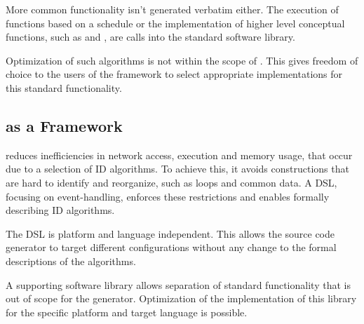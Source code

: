\documentclass[conference]{IEEEtran}
\begin{document}
More common functionality isn't generated verbatim either. The execution of
functions based on a schedule or the implementation of higher level conceptual
functions, such as  and , are calls into the standard
software library.

Optimization of such algorithms is not within the scope of \NAME. This gives
freedom of choice to the users of the framework to select appropriate
implementations for this standard functionality.

\subsection{\NAME as a Framework}

\NAME reduces inefficiencies in network access, execution and memory usage,
that occur due to a selection of ID algorithms. To achieve this, it avoids
constructions that are hard to identify and reorganize, such as loops and
common data. A DSL, focusing on event-handling, enforces these restrictions and
enables formally describing ID algorithms.

The DSL is platform and language independent. This allows the source code
generator to target different configurations without any change to the formal
descriptions of the algorithms.

A supporting software library allows separation of standard functionality that
is out of scope for the generator. Optimization of the implementation of this
library for the specific platform and target language is possible.
\end{document}
